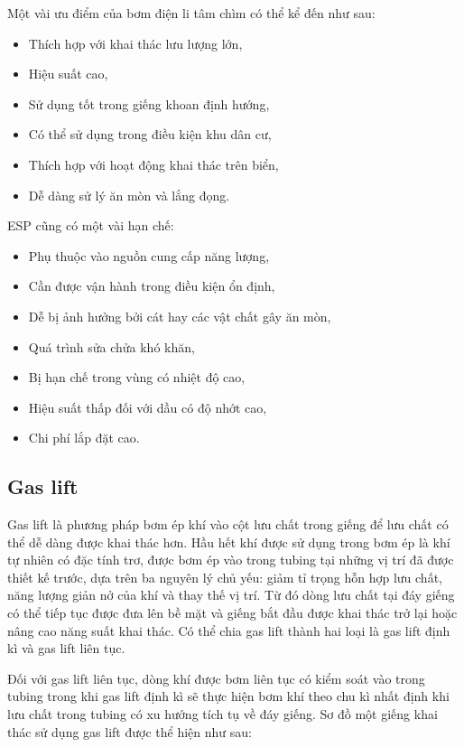 \documentclass[12pt,a4paper]{report}
\begin{document}
Một vài ưu điểm của bơm điện li tâm chìm có thể kể đến như sau:
	\begin{itemize}
		\item Thích hợp với khai thác lưu lượng lớn,
		\item Hiệu suất cao,
		\item Sử dụng tốt trong giếng khoan định hướng,
		\item Có thể sử dụng trong điều kiện khu dân cư,
		\item Thích hợp với hoạt động khai thác trên biển,
		\item Dễ dàng sử lý ăn mòn và lắng đọng.
	\end{itemize}
ESP cũng có một vài hạn chế:
	\begin{itemize}
		\item Phụ thuộc vào nguồn cung cấp năng lượng,
		\item Cần được vận hành trong điều kiện ổn định,
		\item Dễ bị ảnh hưởng bởi cát hay các vật chất gây ăn mòn,
		\item Quá trình sửa chửa khó khăn,
		\item Bị hạn chế trong vùng có nhiệt độ cao,
		\item Hiệu suất thấp đối với dầu có độ nhớt cao,
		\item Chi phí lắp đặt cao.\\
	\end{itemize}

\subsection{Gas lift}
Gas lift là phương pháp bơm ép khí vào cột lưu chất trong giếng để lưu chất có thể dễ dàng được khai thác hơn. Hầu hết khí được sử dụng trong bơm ép là khí tự nhiên có đặc tính trơ, được bơm ép vào trong tubing tại những vị trí đã được thiết kế trước, dựa trên ba nguyên lý chủ yếu: giảm tỉ trọng hỗn hợp lưu chất, năng lượng giản nở của khí và thay thế vị trí. Từ đó dòng lưu chất tại đáy giếng có thể tiếp tục được đưa lên bề mặt và giếng bắt đầu được khai thác trở lại hoặc nâng cao năng suất khai thác. Có thể chia gas lift thành hai loại là gas lift định kì và gas lift liên tục.

Đối với gas lift liên tục, dòng khí được bơm liên tục có kiểm soát vào trong tubing trong khi gas lift định kì sẽ thực hiện bơm khí theo chu kì nhất định khi lưu chất trong tubing có xu hướng tích tụ về đáy giếng. Sơ đồ một giếng khai thác sử dụng gas lift được thể hiện như sau:
\end{document}

